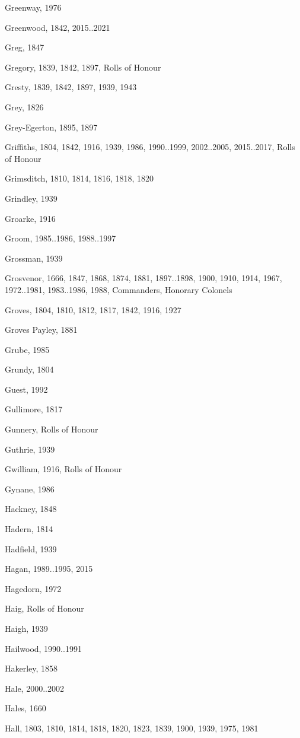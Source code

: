 \begin{theindex}
\item Greenway, 1976
\item Greenwood, 1842, 2015..2021
\item Greg, 1847
\item Gregory, 1839, 1842, 1897, Rolls of Honour
\item Gresty, 1839, 1842, 1897, 1939, 1943
\item Grey, 1826
\item Grey-Egerton, 1895, 1897
\item Griffiths, 1804, 1842, 1916, 1939, 1986, 1990..1999, 2002..2005, 2015..2017, Rolls of Honour
\item Grimsditch, 1810, 1814, 1816, 1818, 1820
\item Grindley, 1939
\item Groarke, 1916
\item Groom, 1985..1986, 1988..1997
\item Grossman, 1939
\item Grosvenor, 1666, 1847, 1868, 1874, 1881, 1897..1898, 1900, 1910, 1914, 1967, 1972..1981, 1983..1986, 1988, Commanders, Honorary Colonels
\item Groves, 1804, 1810, 1812, 1817, 1842, 1916, 1927
\item Groves Payley, 1881
\item Grube, 1985
\item Grundy, 1804
\item Guest, 1992
\item Gullimore, 1817
\item Gunnery, Rolls of Honour
\item Guthrie, 1939
\item Gwilliam, 1916, Rolls of Honour
\item Gynane, 1986
\item Hackney, 1848
\item Hadern, 1814
\item Hadfield, 1939
\item Hagan, 1989..1995, 2015
\item Hagedorn, 1972
\item Haig, Rolls of Honour
\item Haigh, 1939
\item Hailwood, 1990..1991
\item Hakerley, 1858
\item Hale, 2000..2002
\item Hales, 1660
\item Hall, 1803, 1810, 1814, 1818, 1820, 1823, 1839, 1900, 1939, 1975, 1981

\end{theindex}
